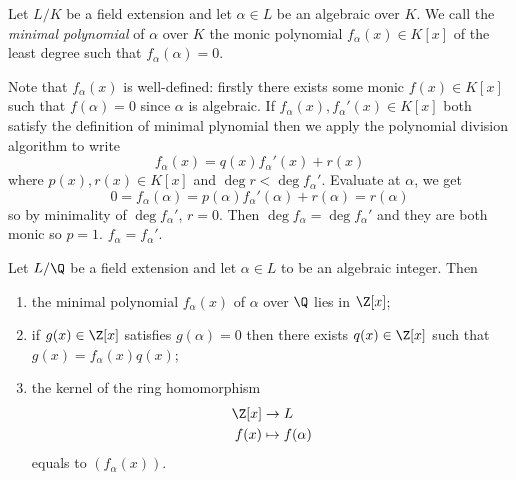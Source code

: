 \documentclass[a4paper]{article}
\begin{document}
\begin{definition}
  Let \(L/K\) be a field extension and let \(\alpha \in L\) be an algebraic over \(K\). We call the \emph{minimal polynomial} of \(\alpha\) over \(K\) the monic polynomial \(f_\alpha(x) \in K[x]\) of the least degree such that \(f_\alpha(\alpha) = 0\).
\end{definition}

Note that \(f_\alpha(x)\) is well-defined: firstly there exists some monic \(f(x) \in K[x]\) such that \(f(\alpha) = 0\) since \(\alpha\) is algebraic. If \(f_\alpha(x), f_\alpha'(x) \in K[x]\) both satisfy the definition of minimal plynomial then we apply the polynomial division algorithm to write
\[
  f_\alpha(x) = q(x)f_\alpha'(x) + r(x)
\]
where \(p(x), r(x) \in K[x]\) and \(\deg r < \deg f_\alpha'\). Evaluate at \(\alpha\), we get
\[
  0 = f_\alpha(\alpha) = p(\alpha)f_\alpha'(\alpha) + r(\alpha) = r(\alpha)
\]
so by minimality of \(\deg f_\alpha'\), \(r = 0\). Then \(\deg f_\alpha = \deg f_\alpha'\) and they are both monic so \(p = 1\). \(f_\alpha = f_\alpha'\).

\begin{lemma}
  Let \(L/\Q\) be a field extension and let \(\alpha \in L\) to be an algebraic integer. Then
  \begin{enumerate}
  \item the minimal polynomial \(f_\alpha(x)\) of \(\alpha\) over \(\Q\) lies in \(\Z[x]\);
  \item if \(g(x) \in \Z[x]\) satisfies \(g(\alpha) = 0\) then there exists \(q(x) \in \Z[x]\) such that \(g(x) = f_\alpha(x)q(x)\);
  \item the kernel of the ring homomorphism
    \begin{align*}
      \Z[x] &\to L \\
      f(x) &\mapsto f(\alpha)
    \end{align*}
    equals to \((f_\alpha(x))\).
  \end{enumerate}
\end{lemma}
\end{document}
